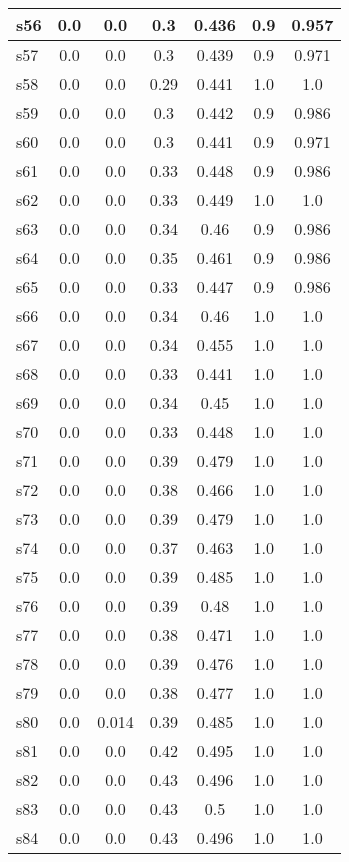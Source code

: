 \documentclass{article}
\begin{document}
\begin{tabular}{|l|c|c|c|c|c|c|}
\hline
s56 &0.0 & 0.0 & 0.3 & 0.436 & 0.9 & 0.957\\
\hline
s57 &0.0 & 0.0 & 0.3 & 0.439 & 0.9 & 0.971\\
\hline
s58 &0.0 & 0.0 & 0.29 & 0.441 & 1.0 & 1.0\\
\hline
s59 &0.0 & 0.0 & 0.3 & 0.442 & 0.9 & 0.986\\
\hline
s60 &0.0 & 0.0 & 0.3 & 0.441 & 0.9 & 0.971\\
\hline
s61 &0.0 & 0.0 & 0.33 & 0.448 & 0.9 & 0.986\\
\hline
s62 &0.0 & 0.0 & 0.33 & 0.449 & 1.0 & 1.0\\
\hline
s63 &0.0 & 0.0 & 0.34 & 0.46 & 0.9 & 0.986\\
\hline
s64 &0.0 & 0.0 & 0.35 & 0.461 & 0.9 & 0.986\\
\hline
s65 &0.0 & 0.0 & 0.33 & 0.447 & 0.9 & 0.986\\
\hline
s66 &0.0 & 0.0 & 0.34 & 0.46 & 1.0 & 1.0\\
\hline
s67 &0.0 & 0.0 & 0.34 & 0.455 & 1.0 & 1.0\\
\hline
s68 &0.0 & 0.0 & 0.33 & 0.441 & 1.0 & 1.0\\
\hline
s69 &0.0 & 0.0 & 0.34 & 0.45 & 1.0 & 1.0\\
\hline
s70 &0.0 & 0.0 & 0.33 & 0.448 & 1.0 & 1.0\\
\hline
s71 &0.0 & 0.0 & 0.39 & 0.479 & 1.0 & 1.0\\
\hline
s72 &0.0 & 0.0 & 0.38 & 0.466 & 1.0 & 1.0\\
\hline
s73 &0.0 & 0.0 & 0.39 & 0.479 & 1.0 & 1.0\\
\hline
s74 &0.0 & 0.0 & 0.37 & 0.463 & 1.0 & 1.0\\
\hline
s75 &0.0 & 0.0 & 0.39 & 0.485 & 1.0 & 1.0\\
\hline
s76 &0.0 & 0.0 & 0.39 & 0.48 & 1.0 & 1.0\\
\hline
s77 &0.0 & 0.0 & 0.38 & 0.471 & 1.0 & 1.0\\
\hline
s78 &0.0 & 0.0 & 0.39 & 0.476 & 1.0 & 1.0\\
\hline
s79 &0.0 & 0.0 & 0.38 & 0.477 & 1.0 & 1.0\\
\hline
s80 &0.0 & 0.014 & 0.39 & 0.485 & 1.0 & 1.0\\
\hline
s81 &0.0 & 0.0 & 0.42 & 0.495 & 1.0 & 1.0\\
\hline
s82 &0.0 & 0.0 & 0.43 & 0.496 & 1.0 & 1.0\\
\hline
s83 &0.0 & 0.0 & 0.43 & 0.5 & 1.0 & 1.0\\
\hline
s84 &0.0 & 0.0 & 0.43 & 0.496 & 1.0 & 1.0\\

\end{tabular}
\end{document}
